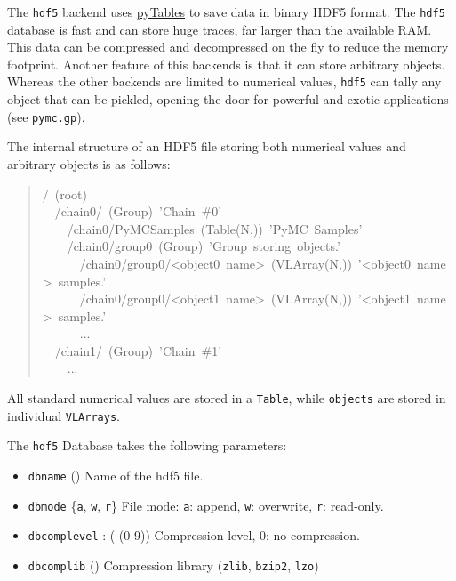 The \texttt{hdf5} backend uses \href{http://www.pytables.org/moin}{pyTables} to save data in binary HDF5 format.
The \texttt{hdf5} database is fast and can store huge traces, far larger than the
available RAM. This data can be compressed and decompressed on the fly to
reduce the memory footprint.
Another feature of this backends is that it can store arbitrary objects.
Whereas the other backends are limited to numerical values, \texttt{hdf5} can
tally any object that can be pickled, opening the door for powerful and
exotic applications (see \texttt{pymc.gp}).

The internal structure of an HDF5 file storing both numerical values and
arbitrary objects is as follows:
\begin{quote}{\ttfamily \raggedright \noindent
/~(root)~\\
~~/chain0/~(Group)~'Chain~{\#}0'~\\
~~~~/chain0/PyMCSamples~(Table(N,))~'PyMC~Samples'~\\
~~~~/chain0/group0~(Group)~'Group~storing~objects.'~\\
~~~~~~/chain0/group0/<object0~name>~(VLArray(N,))~'<object0~name>~samples.'~\\
~~~~~~/chain0/group0/<object1~name>~(VLArray(N,))~'<object1~name>~samples.'~\\
~~~~~~...~\\
~~/chain1/~(Group)~'Chain~{\#}1'~\\
~~~~...
}\end{quote}

All standard numerical values are stored in a \texttt{Table}, while \texttt{objects}
are stored in individual \texttt{VLArrays}.

The \texttt{hdf5} Database takes the following parameters:
\begin{itemize}
\item {}
\texttt{dbname} () Name of the hdf5 file.

\item {}
\texttt{dbmode} {\{}\texttt{a}, \texttt{w}, \texttt{r}{\}} File mode: \texttt{a}: append, \texttt{w}: overwrite,
\texttt{r}: read-only.

\item {}
\texttt{dbcomplevel} : ( (0-9)) Compression level, 0: no compression.

\item {}
\texttt{dbcomplib} () Compression library (\texttt{zlib}, \texttt{bzip2}, \texttt{lzo})

\end{itemize}

